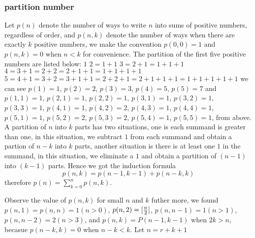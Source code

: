 \subsubsection{partition number}
Let $p(n)$ denote the number of ways to write
$n$ into sums of positive numbers, regardless
of order, and $p(n,k)$ denote the number of ways
when there are exactly $k$ positive numbers,
we make the convention $p(0,0)=1$ and $p(n,k)=0$
when $n < k$ for convenience. The partition of
the first five positive numbers are listed below:
\newline
$1$	\newline
$2 = 1 + 1$	\newline
$3 = 2 + 1 = 1 + 1 + 1$	\newline
$4 = 3 + 1 = 2 + 2 = 2 + 1 + 1 = 1 + 1 + 1 + 1$	\newline
$5 = 4 + 1 = 3 + 2 = 3 + 1 + 1 = 2 + 2 + 1 = 2 + 1 + 1 + 1 = 1 + 1 + 1 + 1 + 1$	\newline
we can see $p(1)=1$, $p(2)=2$, $p(3)=3$, $p(4)=5$, $p(5)=7$ 
and \newline
$p(1,1)=1$,	\newline
$p(2,1)=1$, $p(2,2)=1$,	\newline
$p(3,1)=1$, $p(3,2)=1$, $p(3,3)=1$,	\newline
$p(4,1)=1$, $p(4,2)=2$, $p(4,3)=1$, $p(4,4)=1$,	\newline
$p(5,1)=1$, $p(5,2)=2$, $p(5,3)=2$, $p(5,4)=1$, $p(5,5)=1$,	\newline
from above. A partition of $n$ into $k$ parts has
two situations, one is each summand is greater than one,
in this situation, we subtract $1$ from each summand
and obtain a partion of $n-k$ into $k$ parts,
another situation is there is at least one $1$ in 
the summand, in this situation, we eliminate a $1$
and obtain a partition of $(n-1)$ into $(k-1)$ parts.
Hence we got the induction formula
$$p(n,k)=p(n-1,k-1) + p(n-k,k)$$
therefore $p(n)=\sum_{k=0}^n p(n,k)$.

Observe the value of $p(n,k)$ for small $n$ and $k$ 
futher more, we found $p(n,1)=p(n,n)=1(n > 0)$, $p(n,2)=[{n \over 2}]$,
$p(n,n-1)=1(n > 1)$, $p(n,n-2)=2(n>3)$,
and $p(n,k)=P(n-1,k-1)$ when $2k>n$, becasue $p(n-k,k)=0$ when $n-k<k$.
Let $n=r+k+1$


